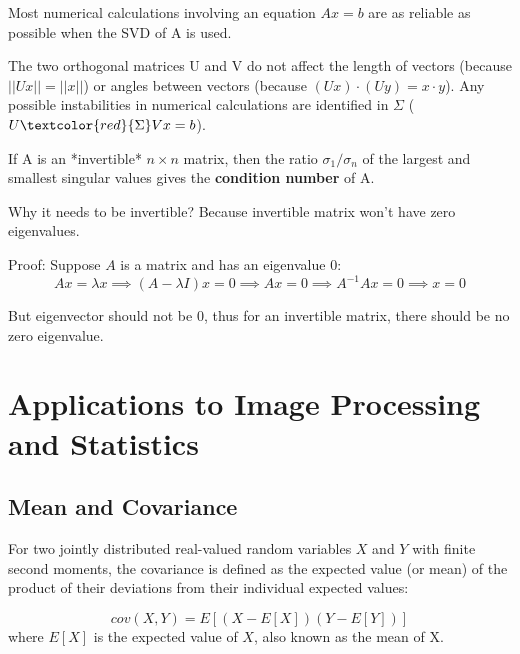 \begin{eg}
    Most numerical calculations involving an equation \(Ax = b\) are as reliable as possible when the SVD of A is used. 

    The two orthogonal matrices U and V do not affect the length of vectors (because \(||Ux|| = ||x||\)) or angles between vectors (because \((Ux)\cdot (Uy) = x \cdot y\)).
    Any possible instabilities in numerical calculations are identified in \(\Sigma\) (\(U \textcolor{red}{\Sigma} V x = b\)).

    If A is an *invertible* \(n \times n\) matrix, then the ratio \(\sigma_1/\sigma_n\) of the largest and smallest singular values gives the \textbf{condition number} of A.   

    \begin{remark}
        Why it needs to be invertible? Because invertible matrix won't have zero eigenvalues.    

        Proof:
        Suppose \(A\) is a matrix and has an eigenvalue 0:
        \[
            Ax = \lambda x 
            \implies 
            (A - \lambda I) x = 0 
            \implies 
            Ax = 0
            \implies
            A^{-1} A x = 0
            \implies
            x = 0
        \]
         
        But eigenvector should not be 0, thus for an invertible matrix, there should be no zero eigenvalue.
    \end{remark}
\end{eg}

\section{Applications to Image Processing and Statistics}

\subsection{Mean and Covariance}

\begin{definition}
    For two jointly distributed real-valued random variables \(X\) and \(Y\) with finite second moments, the covariance is defined as the expected value (or mean) of the product of their deviations from their individual expected values:

    \[
        cov(X, Y) = E[(X - E[X])(Y - E[Y])]
    \]
    where \(E[X]\) is the expected value of \(X\), also known as the mean of X.  
\end{definition}

